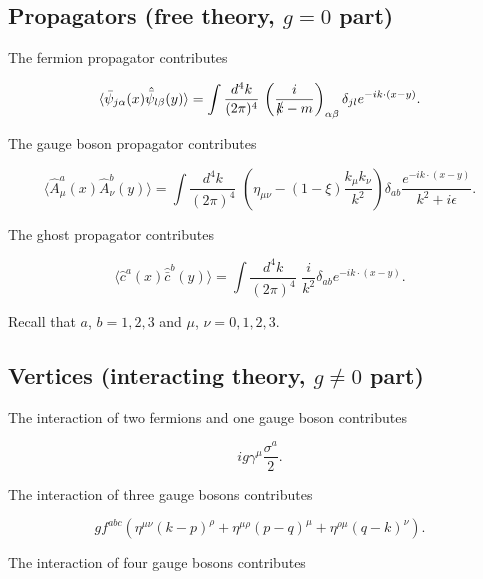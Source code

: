 \documentclass[10pt]{article}
\begin{document}
\subsection*{Propagators (free theory, $g=0$ part)}

\noindent The fermion propagator contributes 

\begin{equation}
\langle \bar{\psi}_{j \alpha} (x) \hat{\bar{\psi}}_{l \beta} (y) \rangle = \int \frac{d^4 k}{(2 \pi)^4} \, \left( \frac{i}{\slashed{k} - m} \right)_{\alpha \beta} \delta_{jl} e^{-i k \cdot (x-y)}.
\end{equation}

\noindent The gauge boson propagator contributes 

\begin{equation}
\langle \hat{A}_\mu^a (x) \hat{A}_\nu^b (y) \rangle = \int \frac{d^4 k}{(2 \pi)^4} \,\, \left( \eta_{\mu\nu} - (1-\xi) \frac{k_\mu k_\nu}{k^2} \right) \delta_{ab} \frac{e^{-i k \cdot (x-y)}}{k^2 + i \epsilon}.
\end{equation}

\noindent The ghost propagator contributes 

\begin{equation}
\langle \hat{c}^a (x) \hat{\bar{c}}^b (y) \rangle = \int \frac{d^4 k}{(2 \pi)^4} \,\, \frac{i}{k^2} \delta_{ab} e^{-i k \cdot (x-y)}.
\end{equation}

\noindent Recall that $a$, $b = 1,2,3$ and $\mu$, $\nu = 0,1,2,3$.

\subsection*{Vertices (interacting theory, $g \ne 0$ part)}

\noindent The interaction of two fermions and one gauge boson contributes

\begin{equation}
i g \gamma^\mu \frac{\sigma^a}{2}.
\end{equation}

\noindent The interaction of three gauge bosons contributes

\begin{equation}
g f^{abc} \left( \eta^{\mu\nu}(k-p)^\rho + \eta^{\mu\rho} (p-q)^\mu + \eta^{\rho\mu} (q-k)^\nu \right).
\end{equation}

\noindent The interaction of four gauge bosons contributes
\end{document}
